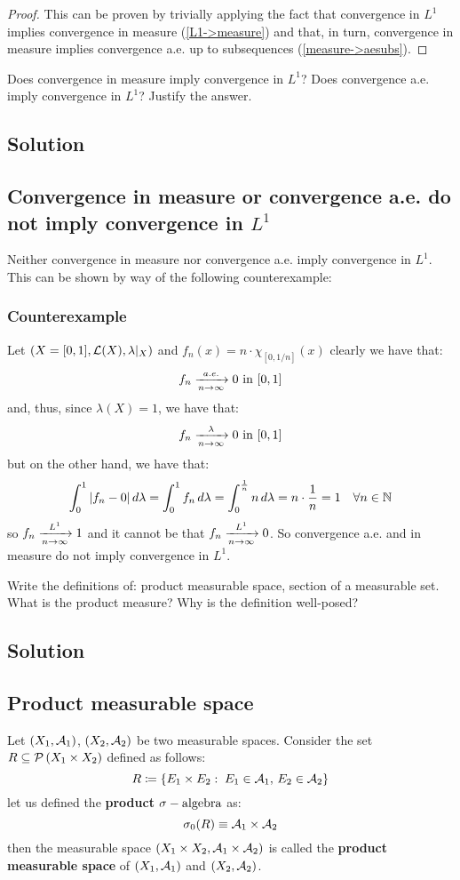 \begin{proof}
    This can be proven by trivially applying the fact that convergence in $L^1$ implies convergence in measure (\ref{L1->measure}) and that, in turn, convergence in measure implies convergence a.e. up to subsequences (\ref{measure->aesubs}).
\end{proof}


\question
Does convergence in measure imply convergence in $L^1$? Does convergence a.e. imply convergence in $L^1$? Justify the answer.

\subsection*{Solution}

\subsection{Convergence in measure or convergence a.e. do not imply convergence in \texorpdfstring{$L^1$}{L1}}
Neither convergence in measure nor convergence a.e. imply convergence in $L^1$. This can be shown by way of the following counterexample:

\subsubsection{Counterexample}
Let $(X=[0,1], \mathcal{L}(X), \lambda|_X)$ and $f_n(x) = n \cdot \chi_{[0,1/n]}(x)$ clearly we have that:
\[
    f_n \xrightarrow[n\to\infty]{a.e.} 0 \text{ in } [0,1]    
\]
and, thus, since $\lambda(X)=1$, we have that:
\[
    f_n \xrightarrow[n\to\infty]{\lambda} 0 \text{ in } [0,1]
\]
but on the other hand, we have that:
\[
    \int_0^1 |f_n-0| \, d\lambda = \int_0^1 f_n \, d\lambda = \int_0^{\frac{1}{n}} n \, d\lambda = n \cdot \frac{1}{n} = 1 \quad \forall n \in \mathbb{N}    
\]
so $f_n \xrightarrow[n\to\infty]{L^1} 1$ and it cannot be that $f_n \xrightarrow[n\to\infty]{L^1} 0$. So convergence a.e. and in measure do not imply convergence in $L^1$.


\question
Write the definitions of: product measurable space, section of a measurable set. What is the product measure? Why is the definition well-posed?

\subsection*{Solution}

\subsection{Product measurable space}
Let $(X_1, \mathcal{A}_1)$, $(X_2, \mathcal{A}_2)$ be two measurable spaces. Consider the set $R\subseteq \mathcal{P}\left(X_1 \times X_2\right)$ defined as follows:
\[
    R \coloneqq \{ E_1 \times E_2: \; E_1 \in \mathcal{A}_1, \, E_2 \in \mathcal{A}_2 \}    
\]
let us defined the \textbf{product $\sigma-\text{algebra}$} as:
\[
    \sigma_0(R) \equiv \mathcal{A}_1 \times \mathcal{A}_2   
\]
then the measurable space $(X_1 \times X_2, \mathcal{A}_1 \times \mathcal{A}_2)$ is called the \textbf{product measurable space} of $(X_1, \mathcal{A}_1)$ and $(X_2, \mathcal{A}_2)$.

